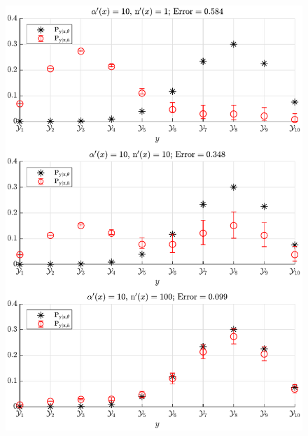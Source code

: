\documentclass[aspectratio=169,usenames,dvipsnames]{beamer}
\begin{document}
\begin{frame}
\begin{columns}[c]
\begin{column}{0.35\linewidth}
\begin{figure}
\centering
\includegraphics[width=1\linewidth]{P_yx_error_a0_10.pdf}
\end{figure}
\end{column}

\end{columns}

\end{frame}
\end{document}
